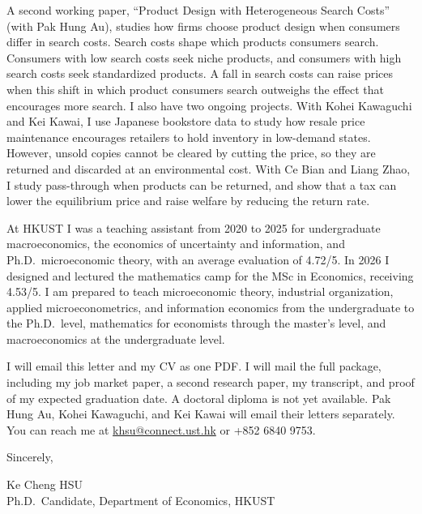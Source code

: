 \documentclass[11pt]{article}
\begin{document}
A second working paper, ``Product Design with Heterogeneous Search Costs'' (with Pak Hung Au), studies how firms choose product design when consumers differ in search costs. Search costs shape which products consumers search. Consumers with low search costs seek niche products, and consumers with high search costs seek standardized products. A fall in search costs can raise prices when this shift in which product consumers search outweighs the effect that encourages more search. I also have two ongoing projects. With Kohei Kawaguchi and Kei Kawai, I use Japanese bookstore data to study how resale price maintenance encourages retailers to hold inventory in low-demand states. However, unsold copies cannot be cleared by cutting the price, so they are returned and discarded at an environmental cost. With Ce Bian and Liang Zhao, I study pass-through when products can be returned, and show that a tax can lower the equilibrium price and raise welfare by reducing the return rate.

At HKUST I was a teaching assistant from 2020 to 2025 for undergraduate macroeconomics, the economics of uncertainty and information, and Ph.D.\ microeconomic theory, with an average evaluation of 4.72/5. In 2026 I designed and lectured the mathematics camp for the MSc in Economics, receiving 4.53/5. I am prepared to teach microeconomic theory, industrial organization, applied microeconometrics, and information economics from the undergraduate to the Ph.D.\ level, mathematics for economists through the master's level, and macroeconomics at the undergraduate level.

I will email this letter and my CV as one PDF. I will mail the full package, including my job market paper, a second research paper, my transcript, and proof of my expected graduation date. A doctoral diploma is not yet available. Pak Hung Au, Kohei Kawaguchi, and Kei Kawai will email their letters separately. You can reach me at \href{mailto:khsu@connect.ust.hk}{khsu@connect.ust.hk} or +852 6840 9753.

\vspace{0.25em}
Sincerely,

\vspace{0.25em}
Ke Cheng HSU \\
Ph.D.\ Candidate, Department of Economics, HKUST
\end{document}
